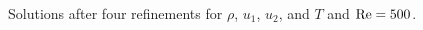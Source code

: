 \documentclass{article}
\newcommand{\Reyn}{\rm Re}
\begin{document}
\begin{figure}[!h]
\caption{Solutions after four refinements for $\rho$, $u_1$, $u_2$, and $T$ and $\Reyn = 500$.}
\label{fig:Re500}
\end{figure}
\end{document}
